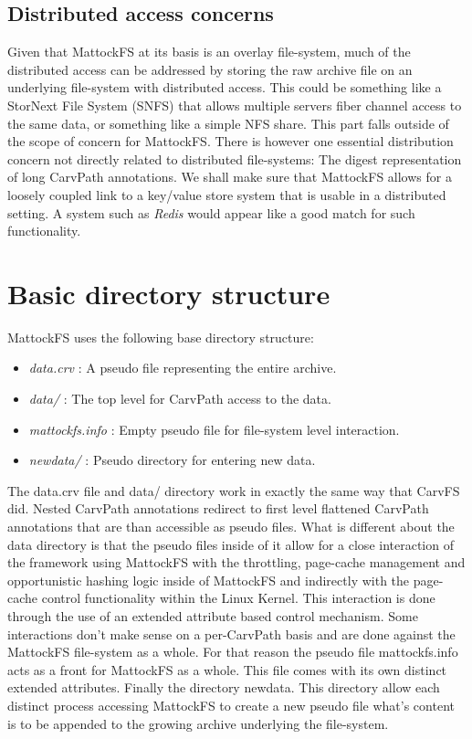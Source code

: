 \subsection{Distributed access concerns}
Given that MattockFS at its basis is an overlay file-system, much of the distributed access can be addressed by storing the raw archive file on an underlying file-system with distributed access. This could be something like a StorNext File System (SNFS) that allows multiple servers fiber channel access to the same data, or something like a simple NFS share. This part falls outside of the scope of concern for MattockFS.
There is however one essential distribution concern not directly related to distributed file-systems: The digest representation of long CarvPath annotations. We shall make sure that MattockFS allows for a loosely coupled link to a key/value store system that is usable in a distributed setting. A system such as \emph{Redis} would appear like a good match for such functionality. 
\section{Basic directory structure}
MattockFS uses the following base directory structure:
\begin{itemize}
\item \emph{data.crv} : A pseudo file representing the entire archive.
\item \emph{data/} : The top level for CarvPath access to the data.
\item \emph{mattockfs.info} : Empty pseudo file for file-system level interaction.
\item \emph{newdata/} : Pseudo directory for entering new data.
\end{itemize}
The data.crv file and data/ directory work in exactly the same way that CarvFS did. Nested CarvPath annotations redirect to first level flattened CarvPath annotations that are than accessible as pseudo files. What is different about the data directory is that the pseudo files inside of it allow for a close interaction of the framework using MattockFS with the throttling, page-cache management and opportunistic hashing logic inside of MattockFS and indirectly with the page-cache control functionality within the Linux Kernel. This interaction is done through the use of an extended attribute based control mechanism. Some interactions don't make sense on a per-CarvPath basis and are done against the MattockFS file-system as a whole. For that reason the pseudo file mattockfs.info acts as a front for MattockFS as a whole. This file comes with its own distinct extended attributes. Finally the directory newdata. This directory allow each distinct process accessing MattockFS to create a new pseudo file what's content is to be appended to the growing archive underlying the file-system. 
